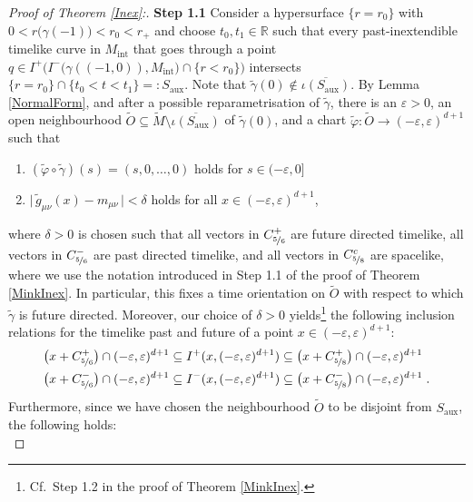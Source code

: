 \documentclass[reqno]{article}
\newcommand{\R}{\mathbb{R}}
\newcommand{\ed}{(-\varepsilon, \varepsilon)^{d+1}}
\newcommand{\Mint}{M_{\mathrm{int}}}
\begin{document}
\begin{proof}[Proof of Theorem \ref{Inex}:]
\textbf{Step 1.1}
Consider a hypersurface $\{r = r_0\}$ with $0< r\big(\gamma(-1)\big) < r_0 < r_+$ and choose $t_0, t_1 \in \R$ such that every past-inextendible timelike curve in $\Mint$ that goes through a point $q \in I^+\Big( I^-\big(\gamma((-1,0)),\Mint\big) \cap \{ r < r_0\}\Big)$ intersects $\{r=r_0\} \cap \{t_0 < t < t_1\} =:S_\mathrm{aux}$.
Note that $\tilde{\gamma}(0) \notin \overline{\iota({S_\mathrm{aux}})}$. By Lemma \ref{NormalForm}, and after a possible reparametrisation of $\tilde{\gamma}$, there is an $\varepsilon >0$, an open neighbourhood $\tilde{O} \subseteq \tilde{M} \setminus \overline{\iota(S_\mathrm{aux})}$ of $\tilde{\gamma}(0)$, and a chart $\tilde{\varphi} : \tilde{O} \to \ed$ such that
\begin{enumerate}
\item $(\tilde{\varphi} \circ \tilde{\gamma}) (s) = (s,0, \ldots, 0) $ holds for $s \in (-\varepsilon, 0]$
\item $\big| \,\tilde{g}_{\mu \nu}(x) - m_{\mu \nu} \,\big| < \delta $ holds for all $x \in (-\varepsilon , \varepsilon)^{d+1}$\;,
\end{enumerate}
where $\delta >0$ is chosen such that all vectors in $C^+_{\nicefrac{5}{6}}$ are future directed timelike, all vectors in $C^-_{\nicefrac{5}{6}}$ are past directed timelike, and all vectors in $C^c_{\nicefrac{5}{8}}$ are spacelike, where we use the notation introduced in Step 1.1 of the proof of Theorem \ref{MinkInex}. In particular, this fixes a time orientation on $\tilde{O}$ with respect to which $\tilde{\gamma}$ is future directed. Moreover, our choice of $\delta >0$ yields\footnote{Cf.\ Step 1.2 in the proof of Theorem \ref{MinkInex}.} the following inclusion relations for the timelike past and future of a point $x \in (-\varepsilon, \varepsilon)^{d+1}$:
\begin{equation}
\label{EstimatesOnPastAndFuture}
\begin{split}
&\big( x + C^+_{\nicefrac{5}{6}}\big) \cap  \ed \subseteq I^+(x, (-\varepsilon, \varepsilon)^{d+1}) \subseteq \big( x + C^+_{\nicefrac{5}{8}}\big) \cap  \ed \\
&\big( x + C^-_{\nicefrac{5}{6}}\big) \cap  \ed \subseteq I^-(x, (-\varepsilon, \varepsilon)^{d+1}) \subseteq \big( x + C^-_{\nicefrac{5}{8}}\big) \cap  \ed  \;.
\end{split}
\end{equation}
Furthermore, since we have chosen the neighbourhood $\tilde{O}$ to be disjoint from $S_\mathrm{aux}$, the following holds:
\begin{equation}

\end{equation}
\end{proof}
\end{document}
